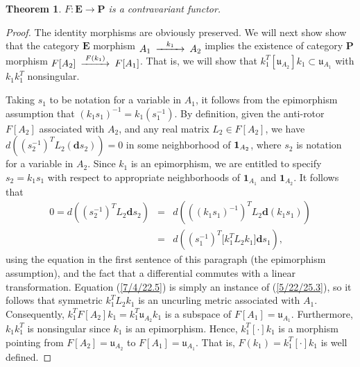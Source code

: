 \documentclass{amsart}
\newtheorem{theorem}{Theorem}
\theoremstyle{definition}
\numberwithin{theorem}{section}
\numberwithin{equation}{section}
\begin{document}
\begin{theorem}\label{6/13/22.1}  $F: \mathbf{E}\rightarrow \mathbf{P}$ is a contravariant functor. 
 \end{theorem}
 \begin{proof}  The identity morphisms are obviously preserved.
We will next show show that the category $\mathbf{E}$ morphism $ \begin{CD}  A_1 @>k_1>> A_2\end{CD}$ implies the existence of category {\bf P} morphism $ \begin{CD}  F[A_2] @>F(k_1)>> F[A_1]\end{CD}$.  That is, we will show that $k_1^T[\mathfrak{u}_{A_2}]k_1 \subset \mathfrak{u}_{A_1}$ with $k_1k_1^T$ nonsingular.

 Taking $s_1$ to be notation for a variable in $A_1$, it follows from the epimorphism assumption that $(k_1s_1)^{-1} = k_1(s_1^{-1})$.  By definition, given the anti-rotor $F[A_2]$ associated with $A_2$, and any real matrix  $L_2 \in F[A_2]$, we have $d\left((s_2^{-1})^TL_2 (\mathbf{d}s_2)\right) = 0$ in some neighborhood of ${\bf 1}_{A_2}$, where $s_2$ is notation for a variable in $A_2$.  Since $k_1$ is an epimorphism, we are entitled to specify $s_2=k_1 s_1$ with respect to appropriate neighborhoods of $\mathbf{1}_{A_1}$ and $\mathbf{1}_{A_2}$.   It follows that \begin{eqnarray}\nonumber 0 = d\left((s_2^{-1})^TL_2 \mathbf{d}s_2\right) &=&  d\left(((k_1s_1)^{-1})^TL_2 \mathbf{d}(k_1s_1)\right) \\  &=& d\left((s_1^{-1})^T \big[k_1^T L_2k_1\big]\mathbf{d}s_1\right), \label{7/4/22.5}  \end{eqnarray}   using the equation in the first sentence of this paragraph (the epimorphism assumption), and the fact that a differential commutes with a linear transformation.  Equation (\ref{7/4/22.5}) is simply an instance of (\ref{5/22/25.3}), so it follows that symmetric $k_1^T L_2k_1$ is an uncurling metric associated with $A_1$.  
 Consequently, $k_1^TF[A_2]k_1 = k_1^T\mathfrak{u}_{A_2}k_1$ is a subspace of $F[A_1] = \mathfrak{u}_{A_1}$.  Furthermore, $k_1k_1^T$ is nonsingular since $k_1$ is an epimorphism.  Hence, $k_1^T[\cdot]k_1$ is a morphism pointing from $F[A_2]= \mathfrak{u}_{A_2}$ to $F[A_1]=\mathfrak{u}_{A_1}$.  That is, $F(k_1)=k_1^T[\cdot]k_1$ is well defined.


\end{proof}
\end{document}
